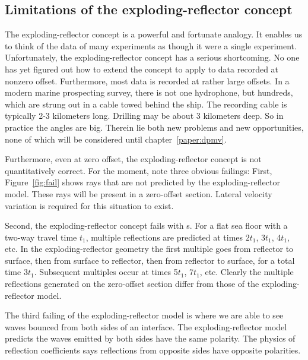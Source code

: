 \subsection{Limitations of the exploding-reflector concept}
\par
The exploding-reflector concept is a powerful and fortunate analogy.
It enables us to think of the data of many experiments
as though it were a single experiment.
Unfortunately,
the exploding-reflector concept has a serious shortcoming.
No one has yet figured out how to extend the concept
to apply to data recorded at nonzero offset.
Furthermore, most data is recorded at rather large offsets.
In a modern marine prospecting survey,
there is not one hydrophone,
but hundreds, which are strung out in a cable towed behind the ship.
The recording cable
is typically 2-3 kilometers long.
Drilling may be about 3 kilometers deep.
So in practice the angles are big.
Therein lie both new problems and new opportunities,
none of which will be considered until 
chapter~\ref{paper:dpmv}.
\par
Furthermore, even at zero offset,
the exploding-reflector concept is not quantitatively correct.
For the moment, note three obvious failings:
First, Figure~\ref{fig:fail} shows rays that are not predicted
by the exploding-reflector model.
These rays will be present in a zero-offset section.
Lateral velocity variation is required for this
situation to exist.  
\par
Second, the exploding-reflector concept fails with s.
For a flat sea floor with a two-way travel time  $t_1$, multiple reflections
are predicted at times  $2t_1$,  3$t_1$,  4$t_1$, etc.
In the exploding-reflector geometry the first multiple
goes from reflector to surface,
then from surface to reflector,
then from reflector to surface, for a total time  3$t_1$.
Subsequent multiples occur at times  5$t_1$,  7$t_1$, etc.
Clearly the multiple reflections generated on the zero-offset section
differ from those of the exploding-reflector model.
\par
The third failing of the exploding-reflector model
is where we are able to see waves
bounced from both sides of an interface.
The exploding-reflector model predicts
the waves emitted by both sides have the same polarity.
The physics of reflection coefficients says
reflections from opposite sides have opposite polarities.


